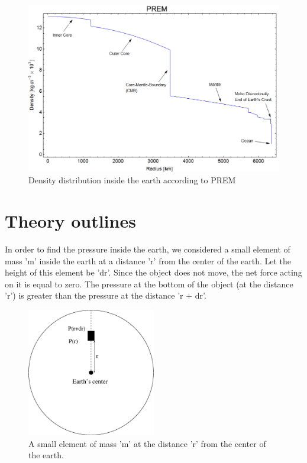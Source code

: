 \documentclass[12pt]{article}
\begin{document}
\begin{figure}[H]
\centering
\includegraphics[width=1.0\textwidth]{density.eps}\caption{Density distribution inside the earth according to PREM}
\end{figure}

\section{Theory outlines}
In order to find the pressure inside the earth, we considered a small element of mass 'm' inside the earth at a distance 'r' from the center of the earth. Let the height of this element be 'dr'. Since the object does not move, the net force acting on it is equal to zero. The pressure at the bottom of the object (at the distance 'r') is greater than the pressure at the distance 'r + dr'.  


\begin{figure}[H]
\centering
\includegraphics[width=0.5\textwidth]{earth_pressure.eps}\caption{A small element of mass 'm' at the distance 'r' from the center of the earth.}
\end{figure}
\end{document}
